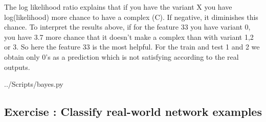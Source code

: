 \documentclass[10pt,a4paper]{article}
\newcommand{\exercise}[1]
{
  \stepcounter{subsection}
  \subsection*{Exercise \thesubsection: #1}

}
\begin{document}
\begin{enumerate}
The log likelihood ratio explains that if you have the variant X you have log(likelihood) more chance to have a complex (C). If negative, it diminishes this chance. To interpret the results above, if for the feature 33 you have variant 0, you have 3.7 more chance that it doesn't make a complex than with variant 1,2 or 3. So here the feature 33 is the most helpful. For the train and test 1 and 2 we obtain only 0's as a prediction which is not satisfying according to the real outputs. %

 {../Scripts/bayes.py}


\end{enumerate}


\newpage
\exercise{Classify real-world network examples}
\end{document}
